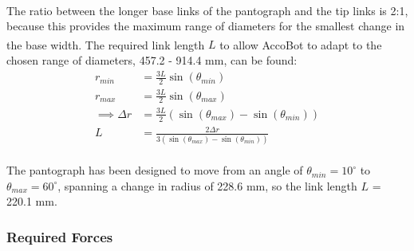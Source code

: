 \documentclass[11pt]{article}		%
\newcommand{\supercite}[1]{\textsuperscript{\cite{#1}}}		%
\begin{document}
    			\\
                \hspace*{3ex}The ratio between the longer base links of the pantograph and the tip links is 2:1, because this provides the maximum range of diameters for the smallest change in the base width\supercite{okada1987mogrer}.
				The required link length $L$ to allow AccoBot to adapt to the chosen range of diameters, 457.2 - 914.4 mm, can be found:
				\begin{align}
					r_{min} &= \frac{3L}{2} \sin \left( \theta_{min} \right) \label{rMin}
					\\
					r_{max} &= \frac{3L}{2} \sin \left( \theta_{max} \right)
					\\
					\implies \Delta r &= \frac{3L}{2} \left( \sin \left( \theta_{max} \right) - \sin \left( \theta_{min} \right) \right)
					\\
					L &= \frac{2 \Delta r}{3 \left( \sin \left( \theta_{max} \right) - \sin \left( \theta_{min} \right) \right)}
				\end{align}
				\\
                \hspace*{3ex}The pantograph has been designed to move from an angle of $\theta_{min} = 10^\circ$ to $\theta_{max} = 60^\circ$, spanning a change in radius of 228.6 mm, so the link length $L$ = 220.1 mm.
			
			\subsubsection{Required Forces} \label{requiredForce}
			
\end{document}
